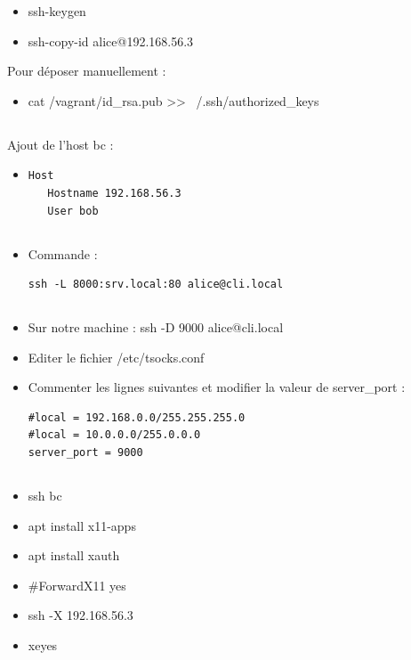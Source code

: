 \documentclass{article}
\begin{document}
\begin{itemize}
    \item ssh-keygen
    \item ssh-copy-id alice@192.168.56.3
\end{itemize}
Pour déposer manuellement : 
\begin{itemize}
    \item cat /vagrant/id\_rsa.pub >> ~/.ssh/authorized\_keys 
\end{itemize}

\subsection{}

Ajout de l'host bc :
\begin{itemize}
\item
\begin{lstlisting}
Host
   Hostname 192.168.56.3
   User bob
\end{lstlisting}
\end{itemize}
\subsection{}
\begin{itemize}
    \item Commande : 
\begin{lstlisting}
ssh -L 8000:srv.local:80 alice@cli.local 
\end{lstlisting}
\end{itemize}

\subsection{}
\begin{itemize}
    \item Sur notre machine : ssh -D 9000 alice@cli.local
    \item Editer le fichier /etc/tsocks.conf
    \item Commenter les lignes suivantes et modifier la valeur de server\_port :
\begin{lstlisting}
#local = 192.168.0.0/255.255.255.0
#local = 10.0.0.0/255.0.0.0
server_port = 9000

\end{lstlisting}
\end{itemize}

\subsection{}
\begin{itemize}
    \item ssh bc
    \item apt install x11-apps
    \item apt install xauth
    \item \#ForwardX11 yes
    \item ssh -X 192.168.56.3
    \item xeyes
\end{itemize}
\end{document}

